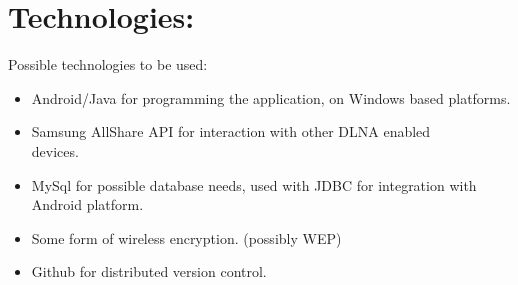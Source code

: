 \documentclass[12pt]{article}
\begin{document}
\section{Technologies:}
Possible technologies to be used:
\begin{itemize}
\item Android/Java for programming the application, on Windows based platforms.
\item Samsung AllShare API for interaction with other DLNA enabled\\ devices.
\item MySql for possible database needs, used with JDBC for integration with Android platform.
\item Some form of wireless encryption. (possibly WEP)
\item Github for distributed version control.
\end{itemize}
\end{document}
